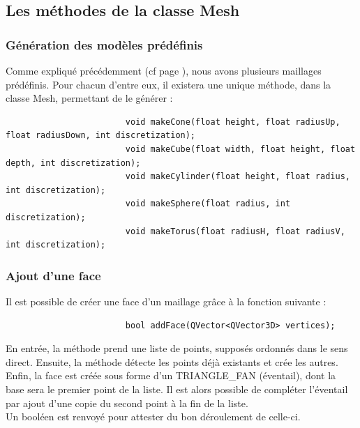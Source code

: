 \documentclass[a4paper]{memoir}
\begin{document}
			\subsection{Les méthodes de la classe Mesh}
				\label{mesh-dev}
				\subsubsection{Génération des modèles prédéfinis}
					Comme expliqué précédemment (cf page \pageref{model-cdc}), nous avons plusieurs maillages prédéfinis. Pour chacun d'entre eux, 
					il existera une unique méthode, dans la classe Mesh, permettant de le générer :
					\begin{verbatim}
						void makeCone(float height, float radiusUp, float radiusDown, int discretization);
						void makeCube(float width, float height, float depth, int discretization);
						void makeCylinder(float height, float radius, int discretization);
						void makeSphere(float radius, int discretization);
						void makeTorus(float radiusH, float radiusV, int discretization);
					\end{verbatim}
					
				\subsubsection{Ajout d'une face}
					Il est possible de créer une face d'un maillage grâce à la fonction suivante :
					\begin{verbatim}
						bool addFace(QVector<QVector3D> vertices);
					\end{verbatim}
					En entrée, la méthode prend une liste de points, supposés ordonnés dans le sens direct. Ensuite, la méthode détecte les points déjà 
					existants et crée les autres. Enfin, la face est créée sous forme d'un TRIANGLE\_FAN (éventail), dont la base sera le premier point 
					de la liste. Il est alors possible de compléter l'éventail par ajout d'une copie du second point à la fin de la liste.\\
					Un booléen est renvoyé pour attester du bon déroulement de celle-ci.
					
\end{document}

